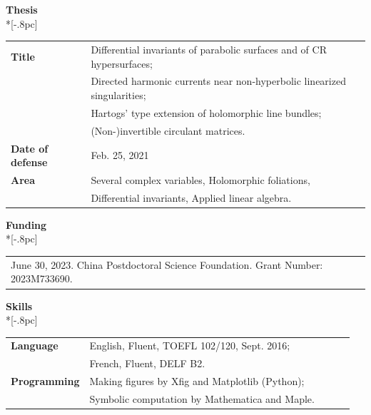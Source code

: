 \documentclass[12pt]{article}
\begin{document}
\medskip

{\large \bf Thesis} \\*[-.8pc]
\underline{\hspace{6.6in}} \\
\begin{tabular}{ll}
{\bf Title} & Differential invariants of parabolic surfaces and of CR hypersurfaces;\\
 & Directed harmonic currents near non-hyperbolic linearized singularities;\\
  & Hartogs' type extension of holomorphic line bundles;\\ 
  & (Non-)invertible circulant matrices.\\
{\bf Date of defense} & Feb. 25, 2021 \\
{\bf Area} &Several complex variables, Holomorphic foliations, \\
& Differential invariants, Applied linear algebra.
\end{tabular}

\medskip

{\large \bf Funding} \\*[-.8pc]
\underline{\hspace{6.6in}} \\ 
\begin{tabular}{l}
June 30, 2023. China Postdoctoral Science Foundation. Grant Number: 2023M733690.
\end{tabular}

\medskip

{\large \bf Skills} \\*[-.8pc]
\underline{\hspace{6.6in}} \\ 
\begin{tabular}{lllll}
{\bf Language}  & English, Fluent, TOEFL 102/120, Sept. 2016;\\
 & French, Fluent, DELF B2.\\
{\bf Programming}  & Making figures by Xfig and Matplotlib (Python); \\
& Symbolic computation by Mathematica and Maple.\\
\end{tabular}

\clearpage
\end{document}
